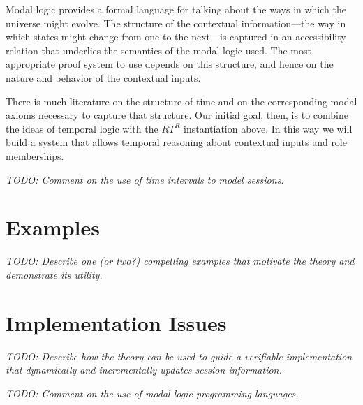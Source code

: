 \documentclass{article}
\newcommand{\todo}[1]{\textit{TODO: #1}}
\begin{document}
Modal logic provides a formal language for talking about the ways in which the universe might
evolve. The structure of the contextual information---the way in which states might change from
one to the next---is captured in an accessibility relation that underlies the semantics of the
modal logic used. The most appropriate proof system to use depends on this structure, and hence
on the nature and behavior of the contextual inputs.

There is much literature on the structure of time and on the corresponding modal axioms
necessary to capture that structure. Our initial goal, then, is to combine the ideas of temporal
logic with the $RT^R$ instantiation above. In this way we will build a system that allows
temporal reasoning about contextual inputs and role memberships.

\todo{Comment on the use of time intervals to model sessions.}

\section{Examples}

\todo{Describe one (or two?) compelling examples that motivate the theory and demonstrate its
  utility.}

\section{Implementation Issues}

\todo{Describe how the theory can be used to guide a verifiable implementation that dynamically
  and incrementally updates session information.}

\todo{Comment on the use of modal logic programming languages.}



\end{document}
